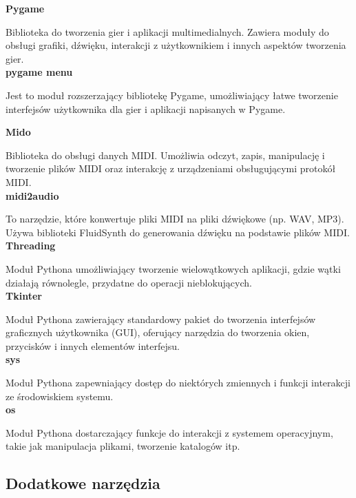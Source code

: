 \noindent\textbf{Pygame}\cite{pygame}

Biblioteka do tworzenia gier i aplikacji multimedialnych. Zawiera moduły do obsługi grafiki, dźwięku, interakcji z użytkownikiem i innych aspektów tworzenia gier.\\

\noindent\textbf{pygame menu}\cite{pygame_menu}

Jest to moduł rozszerzający bibliotekę Pygame, umożliwiający łatwe tworzenie interfejsów użytkownika dla gier i aplikacji napisanych w Pygame.

\newpage
\noindent\textbf{Mido}\cite{mido}

Biblioteka do obsługi danych MIDI. Umożliwia odczyt, zapis, manipulację i tworzenie plików MIDI oraz interakcję z urządzeniami obsługującymi protokół MIDI.\\

\noindent\textbf{midi2audio}\cite{midi2audio}

To narzędzie, które konwertuje pliki MIDI na pliki dźwiękowe (np. WAV, MP3). Używa biblioteki FluidSynth do generowania dźwięku na podstawie plików MIDI.\\

\noindent\textbf{Threading}\cite{threading}

Moduł Pythona umożliwiający tworzenie wielowątkowych aplikacji, gdzie wątki działają równolegle, przydatne do operacji nieblokujących.\\

\noindent\textbf{Tkinter}\cite{tkinter}

Moduł Pythona zawierający standardowy pakiet do tworzenia interfejsów graficznych użytkownika (GUI), oferujący narzędzia do tworzenia okien, przycisków i innych elementów interfejsu.\\

\noindent\textbf{sys}\cite{sys}

Moduł Pythona zapewniający dostęp do niektórych zmiennych i funkcji interakcji ze środowiskiem systemu.\\

\noindent\textbf{os}\cite{os}

Moduł Pythona dostarczający funkcje do interakcji z systemem operacyjnym, takie jak manipulacja plikami, tworzenie katalogów itp.

\subsection{Dodatkowe narzędzia}

